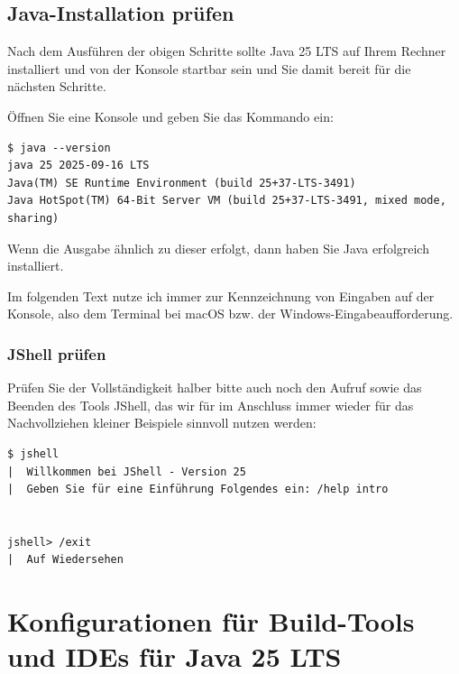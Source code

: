 \subsection{Java-Installation prüfen}


Nach dem Ausführen der obigen Schritte sollte Java 25 LTS auf Ihrem Rechner
installiert und von der Konsole startbar sein und Sie damit bereit für die nächsten Schritte.


Öffnen Sie eine Konsole und geben Sie das Kommando  ein:


\begin{lstlisting}
$ java --version
java 25 2025-09-16 LTS
Java(TM) SE Runtime Environment (build 25+37-LTS-3491)
Java HotSpot(TM) 64-Bit Server VM (build 25+37-LTS-3491, mixed mode, sharing)
\end{lstlisting}


Wenn die Ausgabe ähnlich zu dieser erfolgt, dann haben Sie Java erfolgreich installiert.


Im folgenden Text nutze ich immer \code{\$} zur Kennzeichnung von Eingaben auf der Konsole, also
dem Terminal bei macOS bzw. der Windows-Eingabeaufforderung.




\subsubsection{JShell prüfen}


Prüfen Sie der Vollständigkeit halber bitte auch noch den Aufruf sowie das Beenden des
Tools JShell, das wir für im Anschluss immer wieder für das Nachvollziehen kleiner Beispiele
sinnvoll nutzen werden:


\begin{lstlisting}
$ jshell
|  Willkommen bei JShell - Version 25
|  Geben Sie für eine Einführung Folgendes ein: /help intro


jshell> /exit
|  Auf Wiedersehen
\end{lstlisting}






\section{Konfigurationen für Build-Tools und IDEs für Java 25 LTS}
\label{sec:Konfigurationen für Build-Tools und IDEs für Java 25 LTS}


